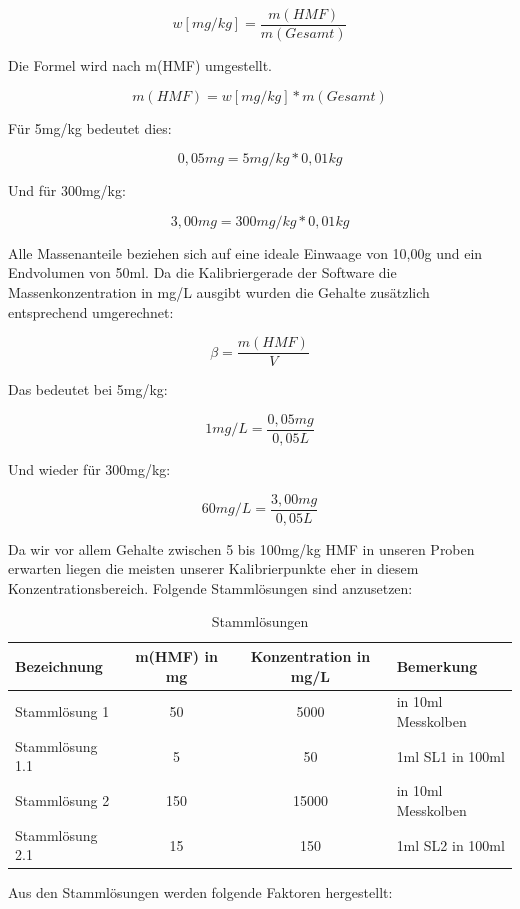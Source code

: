 	\[w[mg/kg]=\frac{ m(HMF) }{ m(Gesamt) }\]
	
Die Formel wird nach m(HMF) umgestellt.

	\[m(HMF)=w[mg/kg]*m(Gesamt)\]
	
Für 5mg/kg bedeutet dies:
	
	\[0,05mg=5mg/kg*0,01kg\]
	
Und für 300mg/kg:

	\[3,00mg=300mg/kg*0,01kg\]
	
Alle Massenanteile beziehen sich auf eine ideale Einwaage von 10,00g und ein Endvolumen von 50ml.
Da die Kalibriergerade der Software die Massenkonzentration in mg/L ausgibt wurden die Gehalte zusätzlich entsprechend umgerechnet:

\[\beta=\frac{ m(HMF) }{ V }\]

Das bedeutet bei 5mg/kg:

\[1mg/L=\frac{ 0,05mg }{ 0,05L }\]

Und wieder für 300mg/kg:

\[60mg/L=\frac{ 3,00mg }{ 0,05L }\]

Da wir vor allem Gehalte zwischen 5 bis 100mg/kg HMF in unseren Proben erwarten liegen die meisten unserer Kalibrierpunkte eher in diesem Konzentrationsbereich.
Folgende Stammlösungen sind anzusetzen:

\begin{table}[htbp]
	\centering
	\caption{Stammlösungen}
		\begin{tabular}{l|c|c|l}
			Bezeichnung & m(HMF) in mg & Konzentration in mg/L & Bemerkung\\
			\hline
			Stammlösung 1 & 50 & 5000  & in 10ml Messkolben\\
			\hline
			Stammlösung 1.1 & 5 & 50 & 1ml SL1 in 100ml\\
			\hline
			Stammlösung 2 & 150 & 15000 & in 10ml Messkolben\\
			\hline
			Stammlösung 2.1 & 15 & 150 & 1ml SL2 in 100ml\\
		\end{tabular}
		\label{tab:Stammlösungen}
\end{table}

Aus den Stammlösungen werden folgende Faktoren hergestellt:

